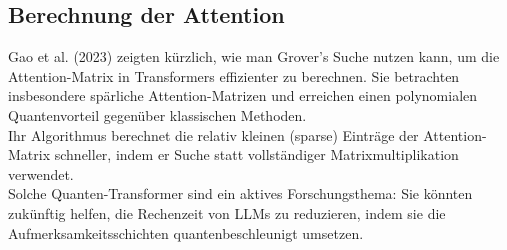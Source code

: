 \subsection{Berechnung der Attention}
Gao et al. (2023) zeigten kürzlich, wie man Grover’s Suche nutzen kann, um die Attention-Matrix in Transformers effizienter zu berechnen. Sie betrachten insbesondere spärliche Attention-Matrizen und erreichen einen polynomialen Quantenvorteil gegenüber klassischen Methoden.\\
Ihr Algorithmus berechnet die relativ kleinen (sparse) Einträge der Attention-Matrix schneller, indem er Suche statt vollständiger Matrixmultiplikation verwendet.\\
Solche Quanten-Transformer sind ein aktives Forschungsthema: Sie könnten zukünftig helfen, die Rechenzeit von LLMs zu reduzieren, indem sie die Aufmerksamkeitsschichten quantenbeschleunigt umsetzen.
\printbibliography

